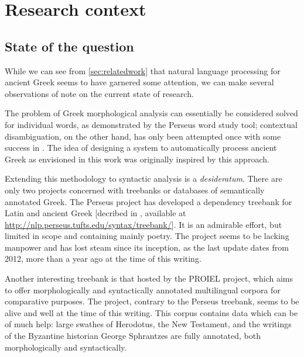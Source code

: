 
\section{Research context}

\subsection{State of the question}

While we can see from \ref{sec:relatedwork} that natural language
processing for ancient Greek seems to have garnered some attention, we
can make several observations of note on the current state of research.

The problem of Greek morphological analysis can essentially be
considered solved for individual words, as demonstrated by the Perseus
word study tool; contextual disambiguation, on the other hand, has
only been attempted once with some success in
\cite{dik2008,dik2009}. The idea of designing a system to
automatically process ancient Greek as envisioned in this work was
originally inspired by this approach.

Extending this methodology to syntactic analysis is a
\textit{desideratum}. There are only two projects concerned with
treebanks or databases of semantically annotated Greek. The Perseus
project has developed a dependency treebank for Latin and ancient
Greek [decribed in \cite{bammancrane2011}, available at
\url{http://nlp.perseus.tufts.edu/syntax/treebank/}]. It is an
admirable effort, but limited in scope and containing mainly poetry.
The project seems to be lacking manpower and has lost steam since its
inception, as the last update dates from 2012, more than a year ago at
the time of this writing.

Another interesting treebank is that hosted by the PROIEL
\citep{proiel} project, which aims to offer morphologically and
syntactically annotated multilingual corpora for comparative
purposes. The project, contrary to the Perseus treebank, seems to be
alive and well at the time of this writing. This corpus contains data
which can be of much help: large swathes of Herodotus, the New
Testament, and the writings of the Byzantine historian George
Sphrantzes are fully annotated, both morphologically and
syntactically.

